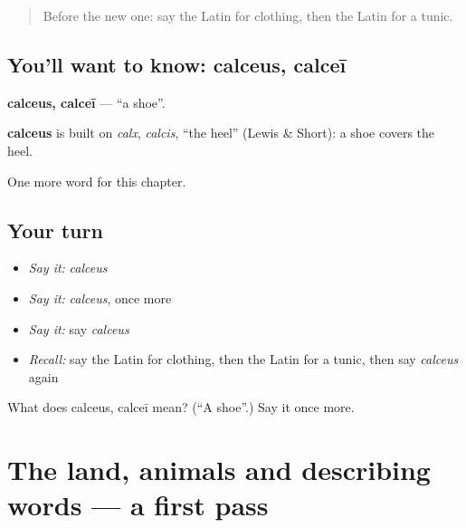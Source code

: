 \label{lesson:LA-C108-calceus}



\begin{quote}
Before the new one: say the Latin for clothing, then the Latin for a tunic.
\end{quote}

\subsection*{You'll want to know: calceus, calceī}
\textbf{calceus, calceī} — \textquotedblleft{}a shoe\textquotedblright{}.

\begin{cousinweb}
\textbf{calceus} is built on \emph{calx}, \emph{calcis}, \textquotedblleft{}the heel\textquotedblright{} (Lewis \& Short): a shoe covers the heel.
\end{cousinweb}

\begin{grammarlens}[title={What you've built}]
One more word for this chapter.
\end{grammarlens}

\subsection*{Your turn}
\begin{itemize}
\raggedright
  \item \emph{Say it:} \emph{calceus}
  \item \emph{Say it:} \emph{calceus}, once more
  \item \emph{Say it:} say \emph{calceus}
  \item \emph{Recall:} say the Latin for clothing, then the Latin for a tunic, then say \emph{calceus} again
\end{itemize}

\begin{tcolorbox}[breakable,colback=teal!4,colframe=teal!35!black,title={Before you move on}]
What does calceus, calceī mean? (\textquotedblleft{}A shoe\textquotedblright{}.) Say it once more.
\end{tcolorbox}
\section[(dialogue)]{The land, animals and describing words — a first pass}

\label{lesson:LA-R108-first-pass-the-land-animals-and-describing-words}



